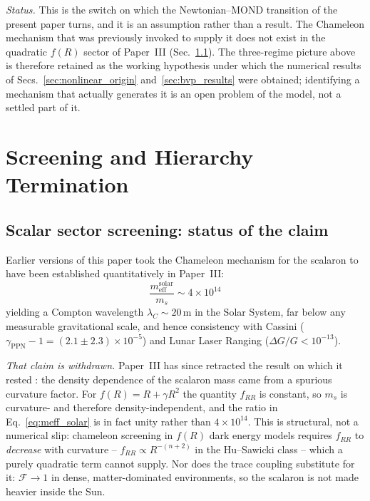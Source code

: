 \documentclass[aps,prd,twocolumn,superscriptaddress,nofootinbib]{revtex4-2}
\begin{document}
\textit{Status.} This is the switch on which the Newtonian--MOND transition of the present paper turns, and it is an assumption rather than a result. The Chameleon mechanism that was previously invoked to supply it does not exist in the quadratic $f(R)$ sector of Paper~III (Sec.~\ref{sec:scalar_screening_status}). The three-regime picture above is therefore retained as the working hypothesis under which the numerical results of Secs.~\ref{sec:nonlinear_origin} and~\ref{sec:bvp_results} were obtained; identifying a mechanism that actually generates it is an open problem of the model, not a settled part of it.


\section{Screening and Hierarchy Termination}
\label{sec:screening}

\subsection{Scalar sector screening: status of the claim}
\label{sec:scalar_screening_status}

Earlier versions of this paper took the Chameleon mechanism for the scalaron to have been established quantitatively in Paper~III:
\begin{equation}
\frac{m_{\mathrm{eff}}^{\mathrm{solar}}}{m_s} \sim 4 \times 10^{14}
\label{eq:meff_solar}
\end{equation}
yielding a Compton wavelength $\lambda_C \sim 20$\,m in the Solar System, far below any measurable gravitational scale, and hence consistency with Cassini ($\gamma_{\mathrm{PPN}} - 1 = (2.1 \pm 2.3) \times 10^{-5}$) \cite{Bertotti2003} and Lunar Laser Ranging ($\Delta G/G < 10^{-13}$).

\textit{That claim is withdrawn.} Paper~III has since retracted the result on which it rested \cite{Geiger2026c}: the density dependence of the scalaron mass came from a spurious curvature factor. For $f(R) = R + \gamma R^2$ the quantity $f_{RR}$ is constant, so $m_s$ is curvature- and therefore density-independent, and the ratio in Eq.~\eqref{eq:meff_solar} is in fact unity rather than $4 \times 10^{14}$. This is structural, not a numerical slip: chameleon screening in $f(R)$ dark energy models requires $f_{RR}$ to \textit{decrease} with curvature -- $f_{RR} \propto R^{-(n+2)}$ in the Hu--Sawicki class \cite{HuSawicki2007} -- which a purely quadratic term cannot supply. Nor does the trace coupling substitute for it: $\mathcal{F} \to 1$ in dense, matter-dominated environments, so the scalaron is not made heavier inside the Sun.
\end{document}
